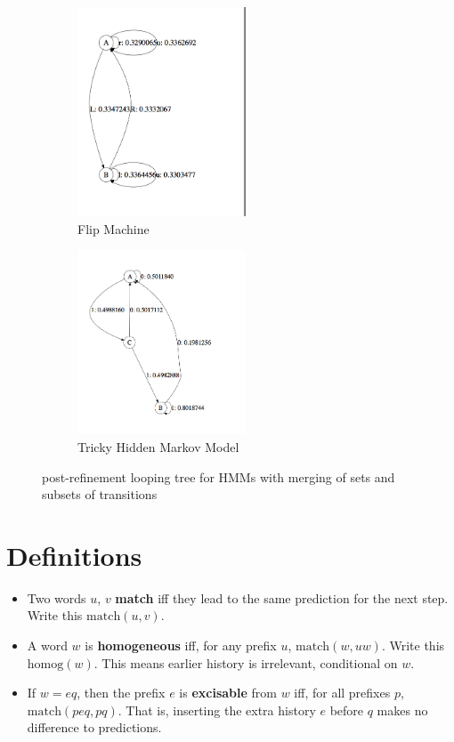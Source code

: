\documentclass{article}
\newcommand{\match}{\ensuremath{\mathrm{match}}}
\newcommand{\homog}{\ensuremath{\mathrm{homog}}}
\begin{document}
\begin{figure}[H]
\centering
\begin{subfigure}{.5\textwidth}
  \centering
  \includegraphics[width=50mm,scale=0.5]{imgs/flip-merge-subset.png}
  \caption{Flip Machine}
  \label{fig:sub1}
\end{subfigure}%
\begin{subfigure}{.5\textwidth}
  \centering
  \includegraphics[width=50mm,scale=0.5]{imgs/TMD-subsetting.png}
  \caption{Tricky Hidden Markov Model}
  \label{fig:sub2}
\end{subfigure}
\caption{post-refinement looping tree for HMMs with merging of sets and subsets
of transitions}
\label{fig:test}
\end{figure}


\appendix

\section{Definitions}

\begin{itemize}
\item Two words $u$, $v$ {\bf match} iff they lead to the same prediction for
  the next step.  Write this $\match(u,v)$.
\item A word $w$ is {\bf homogeneous} iff, for any prefix $u$, $\match(w,uw)$.
  Write this $\homog(w)$.  This means earlier history is irrelevant,
  conditional on $w$.
\item If $w=eq$, then the prefix $e$ is {\bf excisable} from $w$ iff, for all
  prefixes $p$, $\match(peq, pq)$.  That is, inserting the extra history $e$
  before $q$ makes no difference to predictions.
\end{itemize}
\end{document}
